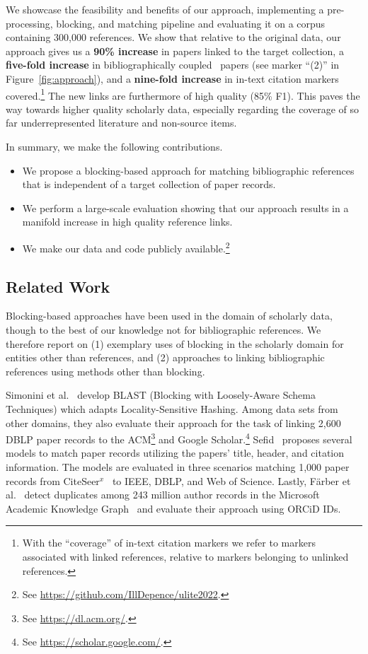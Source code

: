 We showcase the feasibility and benefits of our approach, implementing a pre-processing, blocking, and matching pipeline and evaluating it on a corpus containing 300,000 references.
We show that relative to the original data, our approach gives us a \textbf{90\% increase} in papers linked to the target collection, a \textbf{five-fold increase} in bibliographically coupled~\cite{Boyack2010} papers (see marker ``(2)'' in Figure~\ref{fig:approach}), and a \textbf{nine-fold increase} in in-text citation markers covered.\footnote{With the ``coverage'' of in-text citation markers we refer to markers associated with linked references, relative to markers belonging to unlinked references.} The new links are furthermore of high quality (85\% F1). This paves the way towards higher quality scholarly data, especially regarding the coverage of so far underrepresented literature and non-source items.

In summary, we make the following contributions.

\begin{itemize}
    \item We propose a blocking-based approach for matching bibliographic references that is independent of a target collection of paper records.
    \item We perform a large-scale evaluation showing that our approach results in a manifold increase in high quality reference links.
    \item We make our data and code publicly available.\footnote{See \url{https://github.com/IllDepence/ulite2022}.}
\end{itemize}

\subsection{Related Work}
Blocking-based approaches have been used in the domain of scholarly data, though to the best of our knowledge not for bibliographic references. We therefore report on (1) exemplary uses of blocking in the scholarly domain for entities other than references, and (2) approaches to linking bibliographic references using methods other than blocking.

Simonini et al.~\cite{Simonini2016blast} develop BLAST (Blocking with Loosely-Aware Schema Techniques) which adapts Locality-Sensitive Hashing. Among data sets from other domains, they also evaluate their approach for the task of linking 2,600 DBLP paper records to the ACM\footnote{See \url{https://dl.acm.org/}.} and Google Scholar.\footnote{See \url{https://scholar.google.com/}.} 
Sefid~\cite{Sefid2019} proposes several models to match paper records utilizing the papers' title, header, and citation information. The models are evaluated in three scenarios matching 1,000 paper records from CiteSeer$^x$~\cite{CiteSeerX2019} to IEEE, DBLP, and Web of Science.
Lastly, Färber et al.~\cite{FaerberLin2022} detect duplicates among 243 million author records in the Microsoft Academic Knowledge Graph~\cite{MAKG} and evaluate their approach using ORCiD IDs.

